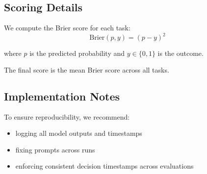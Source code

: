 \documentclass{article} %
\begin{document}
\subsection{Scoring Details}

We compute the Brier score for each task:
\[
\text{Brier}(p, y) = (p - y)^2
\]

where $p$ is the predicted probability and $y \in \{0,1\}$ is the outcome.

The final score is the mean Brier score across all tasks.

\subsection{Implementation Notes}

To ensure reproducibility, we recommend:
\begin{itemize}[noitemsep]
    \item logging all model outputs and timestamps
    \item fixing prompts across runs
    \item enforcing consistent decision timestamps across evaluations
\end{itemize}
\end{document}
